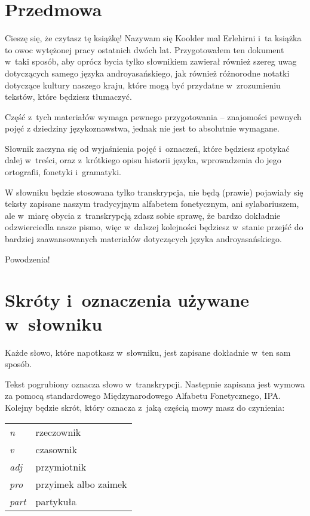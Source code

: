 \newpage

\section{Przedmowa}

\begin{spacing}{1.1}

Cieszę się, że czytasz tę książkę! Nazywam się Koolder mal Erlehirni i~ta książka
to owoc wytężonej pracy ostatnich dwóch lat. Przygotowałem ten dokument w~taki 
sposób, aby oprócz bycia tylko słownikiem zawierał również szereg uwag dotyczących 
samego języka androyasańskiego, jak również różnorodne notatki dotyczące kultury
 naszego kraju, które mogą być przydatne w~zrozumieniu tekstów, które będziesz 
 tłumaczyć.

Część z~tych materiałów wymaga pewnego przygotowania -- znajomości pewnych pojęć
z dziedziny językoznawstwa, jednak nie jest to absolutnie wymagane.

Słownik zaczyna się od wyjaśnienia pojęć i~oznaczeń, które będziesz spotykać
dalej w~treści, oraz z~krótkiego opisu historii języka, wprowadzenia do jego 
ortografii, fonetyki i~gramatyki.

W słowniku będzie stosowana tylko transkrypcja, nie będą (prawie) pojawiały się
teksty zapisane naszym tradycyjnym alfabetem fonetycznym, ani sylabariuszem, ale
w~miarę obycia z~transkrypcją zdasz sobie sprawę, że bardzo dokładnie 
odzwierciedla nasze pismo, więc w~dalszej kolejności będziesz w~stanie przejść 
do bardziej zaawansowanych materiałów dotyczących języka androyasańskiego.

\bigskip

Powodzenia!

\section[Skróty i~oznaczenia]{Skróty i~oznaczenia używane w~słowniku}

Każde słowo, które napotkasz w~słowniku, jest zapisane dokładnie w~ten sam sposób.

Tekst pogrubiony oznacza słowo w~transkrypcji. Następnie zapisana jest wymowa za pomocą standardowego Międzynarodowego Alfabetu Fonetycznego, IPA. Kolejny będzie skrót, który oznacza z~jaką częścią mowy masz do czynienia:

\begin{table}[h]
\begin{tabular}{ll}
\emph{n}    & rzeczownik           \\
\emph{v}    & czasownik            \\
\emph{adj}  & przymiotnik          \\
\emph{pro}  & przyimek albo zaimek \\
\emph{part} & partykuła           
\end{tabular}
\end{table}


\end{spacing}
